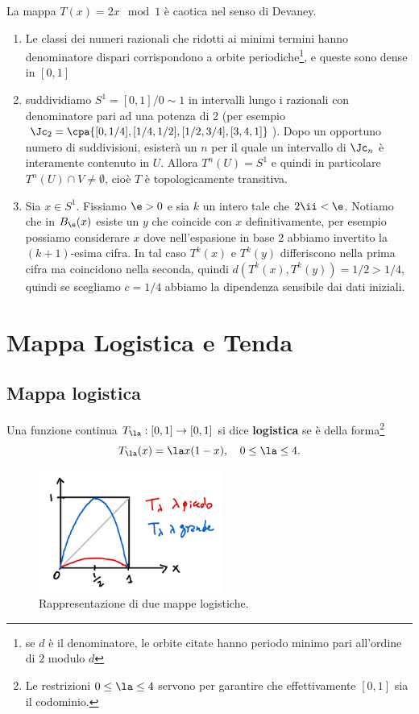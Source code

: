 \begin{example}
La mappa $T(x)=2x\mod 1$ \`e caotica nel senso di Devaney.
\begin{enumerate}
\item Le classi dei numeri razionali che ridotti ai minimi termini hanno denominatore dispari corrispondono a orbite periodiche\footnote{se $d$ \`e il denominatore, le orbite citate hanno periodo minimo pari all'ordine di $2$ modulo $d$}, e queste sono dense in $[0,1]$
\item suddividiamo $S^1=[0,1]/0\sim 1$ in intervalli lungo i razionali con denominatore pari ad una potenza di 2 (per esempio $\Jc_2=\cpa{[0,1/4], [1/4, 1/2], [1/2, 3/4], [3,4,1]}$). Dopo un opportuno numero di suddivisioni, esister\`a un $n$ per il quale un intervallo di $\Jc_n$ \`e interamente contenuto in $U$. Allora $T^n(U)=S^1$ e quindi in particolare $T^n(U)\cap V\neq \emptyset$, cio\`e $T$ \`e topologicamente transitiva.
\item Sia $x\in S^1$. Fissiamo $\e>0$ e sia $k$ un intero tale che $2\ii<\e$. Notiamo che in $B_\e(x)$ esiste un $y$ che coincide con $x$ definitivamente, per esempio possiamo considerare $x$ dove nell'espasione in base 2 abbiamo invertito la $(k+1)$-esima cifra. In tal caso $T^k(x)$ e $T^k(y)$ differiscono nella prima cifra ma coincidono nella seconda, quindi $d(T^k(x),T^k(y))= 1/2>1/4$, quindi se scegliamo $c=1/4$ abbiamo la dipendenza sensibile dai dati iniziali.
\end{enumerate}
\end{example}


\section{Mappa Logistica e Tenda}
\subsection{Mappa logistica} 
\begin{definition}
Una funzione continua $T_\la:[0,1]\to[0,1]$ si dice \textbf{logistica} se \`e della forma\footnote{Le restrizioni $0\leq \la\leq 4$ servono per garantire che effettivamente $[0,1]$ sia il codominio.}
\[T_\la(x)=\la x(1-x),\quad 0\leq \la\leq 4.\]
\end{definition}

\begin{figure}[!htb]
    \centering
    \includegraphics[width=6cm]{Immagini/Logistica.png}
    \caption{Rappresentazione di due mappe logistiche.}
\end{figure}


